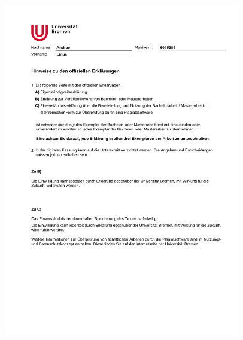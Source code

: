\documentclass[12pt,a4paper, english,twoside]{scrartcl}
\begin{document}
\begin{figure}[!b]
    \includegraphics[width=0.92\textwidth,page=2]{res/eigenstaendigkeitserklaerung_flat.pdf}
\end{figure}
%
\restoregeometry%
\end{document}
